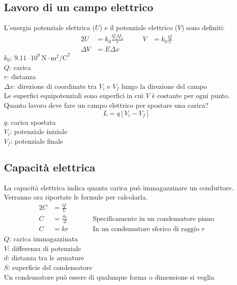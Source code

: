 \subsection{Lavoro di un campo elettrico}
L'energia potenziale elettrica ($U$) e il potenziale elettrico ($V$) sono definiti:
\begin{alignat*}{2}
  U &= k_0\frac{Q_1Q_2}{r} &\qquad V &= k_0\frac{Q}{r}\\
  \Delta V &= E\Delta x &&
\end{alignat*}
\hyperref[tab:k0]{$k_0$}: $9.11\cdot10^9\,\text{N}\cdot\text{m}^2\text{/C}^2$\\
$Q$: carica\\
$r$: distanza\\
$\Delta x$: direzione di coordinate tra $V_i$ e $V_f$ lungo la direzione del campo\\[\baselineskip]
Le superfici equipotenziali sono superfici in cui $V$ è costante per ogni punto.\\[\baselineskip]
Quanto lavoro deve fare un campo elettrico per spostare una carica?
\begin{equation*}
  L = q\left[V_i - V_f\right]
\end{equation*}
$q$: carica spostata\\
$V_i$: potenziale iniziale\\
$V_f$: potenziale finale

\subsection{Capacità elettrica}\label{sub:elettrostatica:capacita}
La capacità elettrica indica quanta carica può immagazzinare un conduttore. Verranno ora 
riportate le formule per calcolarla.
\begin{alignat*}{2}
  C &= \frac{Q}{V} &\qquad &\\
  C &= \frac{S\varepsilon}{d} & &\text{Specificamente in un condensatore piano}\\
  C &= kr & &\text{In un condensatore sferico di raggio } r
\end{alignat*}
$Q$: carica immagazzinata\\
$V$: differenza di potenziale\\ 
$d$: distanza tra le armature\\
$S$: superficie del condensatore\\[\baselineskip]
Un condensatore può essere di qualunque forma o dimensione si voglia



